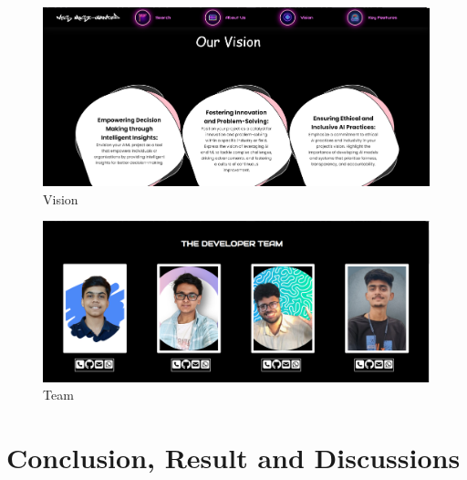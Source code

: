 \documentclass[openany]{report}
\begin{document}
\begin{figure}[H]
    \centering
    \includegraphics[width=.95\textwidth]{../screenshots/vision.png}
    \caption{Vision}
    \label{fig:Vision}
\end{figure}


\begin{figure}[H]
    \centering
    \includegraphics[width=.95\textwidth]{../screenshots/team.png}
    \caption{Team}
    \label{fig:Team}
\end{figure}


\chapter{Conclusion, Result and Discussions}
\end{document}
